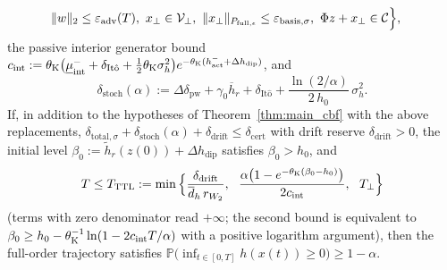 \begin{corollary}
\[\begin{aligned}
&\|w\|_2 \le \varepsilon_{\mathrm{adv}}(T),\ x_\perp \in \mathcal{V}_\perp,\ \|x_\perp\|_{P_{\mathrm{full},\epsilon}} \le \varepsilon_{\mathrm{basis},\sigma},\ \Phi z + x_\perp \in \mathcal{C}\Big\},
\end{aligned}
\]
the passive interior generator bound \(c_{\mathrm{int}} := \theta_{\mathrm{K}}\big(\underline{\mu}^-_{\mathrm{int}} + \delta_{\mathrm{It\hat{o}}} + \frac{1}{2}\theta_{\mathrm{K}}\sigma_h^2\big)e^{-\theta_{\mathrm{K}}(h_{\mathrm{act}}^- + \Delta h_{\mathrm{dip}})}\), and
\begin{equation}
\label{eq:delta_stoch}
\delta_{\mathrm{stoch}}(\alpha) := \Delta\delta_{\mathrm{pw}} + \gamma_0 \overline{h}_r + \delta_{\mathrm{It\hat{o}}} + \frac{\ln(2/\alpha)}{2\,h_0}\,\sigma_h^2.
\end{equation}
If, in addition to the hypotheses of Theorem~\ref{thm:main_cbf} with the above replacements, \(\delta_{\mathrm{total},\sigma} + \delta_{\mathrm{stoch}}(\alpha) + \delta_{\mathrm{drift}} \le \delta_{\mathrm{cert}}\) with drift reserve \(\delta_{\mathrm{drift}} > 0\), the initial level \(\beta_0 := \tilde{h}_r(z(0)) + \Delta h_{\mathrm{dip}}\) satisfies \(\beta_0 > h_0\), and
\begin{equation}
\label{eq:T_TTL}
T \le T_{\mathrm{TTL}} := \min\Big\{\frac{\delta_{\mathrm{drift}}}{\overline{d}_h\,r_{W_2}},\ \ \frac{\alpha\big(1 - e^{-\thK(\beta_0 - h_0)}\big)}{2c_{\mathrm{int}}},\ \ T_\perp\Big\}
\end{equation}
(terms with zero denominator read \(+\infty\); the second bound is equivalent to \(\beta_0 \ge h_0 - \theta_{\mathrm{K}}^{-1}\ln(1 - 2c_{\mathrm{int}}T/\alpha)\) with a positive logarithm argument), then the full-order trajectory satisfies \(\mathbb{P}\big(\inf_{t \in [0, T]} h(x(t)) \ge 0\big) \ge 1 - \alpha\).
\end{corollary}
